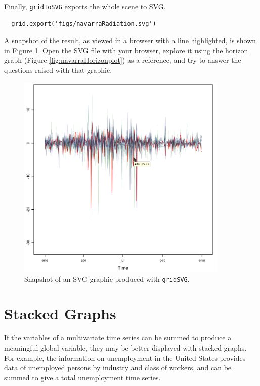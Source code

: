 \documentclass[smallroyalvopaper]{memoir}
\begin{document}
Finally, \texttt{gridToSVG} exports the whole scene to SVG. 

\lstset{language=r,label= ,caption= ,captionpos=b,numbers=none}
\begin{lstlisting}
  grid.export('figs/navarraRadiation.svg')
\end{lstlisting}

A snapshot of the result, as viewed in a browser with a line
highlighted, is shown in Figure \ref{fig:navarraSVG}. Open the SVG
file with your browser, explore it using the horizon graph (Figure
\ref{fig:navarraHorizonplot}) as a reference, and try to answer the
questions raised with that graphic.

\begin{figure}
  \centering
  \includegraphics[width=0.9\textwidth]{figs/navarraSVG_captura.png}
  \caption{\label{fig:navarraSVG}Snapshot of an SVG graphic produced with \texttt{gridSVG}.}
\end{figure}



\section{Stacked Graphs}
\label{sec:org1004137}
If the variables of a multivariate time series can be summed to
produce a meaningful global variable, they may be better displayed
with stacked graphs. For example, the information on unemployment in
the United States provides data of unemployed persons by industry and
class of workers, and can be summed to give a total unemployment time
series.
\end{document}
